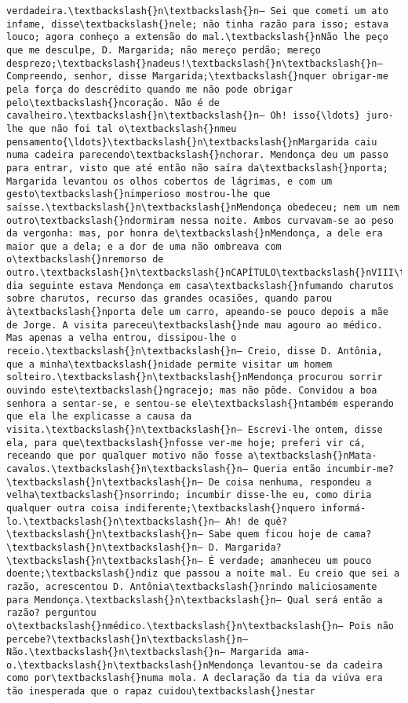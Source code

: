 \documentclass[11pt]{article}
\begin{document}
\begin{Verbatim}[commandchars=\\\{\}]
verdadeira.\textbackslash{}n\textbackslash{}n— Sei que cometi um ato infame, disse\textbackslash{}nele; não tinha razão para isso; estava louco; agora conheço a extensão do mal.\textbackslash{}nNão lhe peço que me desculpe, D. Margarida; não mereço perdão; mereço desprezo;\textbackslash{}nadeus!\textbackslash{}n\textbackslash{}n— Compreendo, senhor, disse Margarida;\textbackslash{}nquer obrigar-me pela força do descrédito quando me não pode obrigar pelo\textbackslash{}ncoração. Não é de cavalheiro.\textbackslash{}n\textbackslash{}n— Oh! isso{\ldots} juro-lhe que não foi tal o\textbackslash{}nmeu pensamento{\ldots}\textbackslash{}n\textbackslash{}nMargarida caiu numa cadeira parecendo\textbackslash{}nchorar. Mendonça deu um passo para entrar, visto que até então não saíra da\textbackslash{}nporta; Margarida levantou os olhos cobertos de lágrimas, e com um gesto\textbackslash{}nimperioso mostrou-lhe que saísse.\textbackslash{}n\textbackslash{}nMendonça obedeceu; nem um nem outro\textbackslash{}ndormiram nessa noite. Ambos curvavam-se ao peso da vergonha: mas, por honra de\textbackslash{}nMendonça, a dele era maior que a dela; e a dor de uma não ombreava com o\textbackslash{}nremorso de outro.\textbackslash{}n\textbackslash{}nCAPÍTULO\textbackslash{}nVIII\textbackslash{}n\textbackslash{}nNo dia seguinte estava Mendonça em casa\textbackslash{}nfumando charutos sobre charutos, recurso das grandes ocasiões, quando parou à\textbackslash{}nporta dele um carro, apeando-se pouco depois a mãe de Jorge. A visita pareceu\textbackslash{}nde mau agouro ao médico. Mas apenas a velha entrou, dissipou-lhe o receio.\textbackslash{}n\textbackslash{}n— Creio, disse D. Antônia, que a minha\textbackslash{}nidade permite visitar um homem solteiro.\textbackslash{}n\textbackslash{}nMendonça procurou sorrir ouvindo este\textbackslash{}ngracejo; mas não pôde. Convidou a boa senhora a sentar-se, e sentou-se ele\textbackslash{}ntambém esperando que ela lhe explicasse a causa da visita.\textbackslash{}n\textbackslash{}n— Escrevi-lhe ontem, disse ela, para que\textbackslash{}nfosse ver-me hoje; preferi vir cá, receando que por qualquer motivo não fosse a\textbackslash{}nMata-cavalos.\textbackslash{}n\textbackslash{}n— Queria então incumbir-me?\textbackslash{}n\textbackslash{}n— De coisa nenhuma, respondeu a velha\textbackslash{}nsorrindo; incumbir disse-lhe eu, como diria qualquer outra coisa indiferente;\textbackslash{}nquero informá-lo.\textbackslash{}n\textbackslash{}n— Ah! de quê?\textbackslash{}n\textbackslash{}n— Sabe quem ficou hoje de cama?\textbackslash{}n\textbackslash{}n— D. Margarida?\textbackslash{}n\textbackslash{}n— É verdade; amanheceu um pouco doente;\textbackslash{}ndiz que passou a noite mal. Eu creio que sei a razão, acrescentou D. Antônia\textbackslash{}nrindo maliciosamente para Mendonça.\textbackslash{}n\textbackslash{}n— Qual será então a razão? perguntou o\textbackslash{}nmédico.\textbackslash{}n\textbackslash{}n— Pois não percebe?\textbackslash{}n\textbackslash{}n— Não.\textbackslash{}n\textbackslash{}n— Margarida ama-o.\textbackslash{}n\textbackslash{}nMendonça levantou-se da cadeira como por\textbackslash{}numa mola. A declaração da tia da viúva era tão inesperada que o rapaz cuidou\textbackslash{}nestar 
\end{Verbatim}
\end{document}
